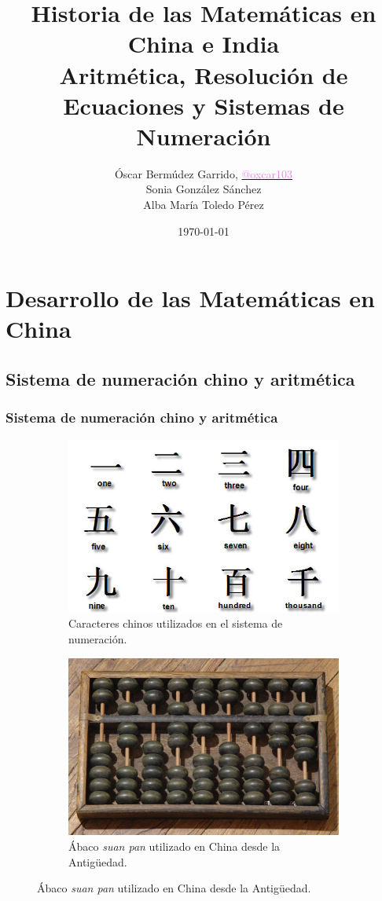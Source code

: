 \documentclass[12pt, aspectratio=169]{beamer} %
\title[Historia de las Matemáticas en China e India]{\Large Historia de las Matemáticas en China e India\\
\normalsize Aritmética, Resolución de Ecuaciones y Sistemas de Numeración} %
\author[Óscar Bermúdez, Sonia González, Alba Mª Toledo]{
	Óscar Bermúdez Garrido, \href{http://www.github.com/oxcar103}{\textcolor{violet}{@oxcar103}}\\
	Sonia González Sánchez \\
	Alba María Toledo Pérez
} %
\institute[UGR] %
{
  Universidad de Granada \\ %
}
\date{\today} %
\begin{document}
\begin{frame}
	\titlepage %
\end{frame}


 


\section{Desarrollo de las Matemáticas en China}
	\subsection{Sistema de numeración chino y aritmética}
		\begin{frame}
			\frametitle{Sistema de numeración chino y aritmética}
			\begin{figure}
			\centering
				\begin{subfigure}{.5\textwidth}
					\centering
					\includegraphics[width = .5\linewidth]{chinese_numbers.jpg}
					\caption{Caracteres chinos utilizados en el sistema de numeración.}
				\end{subfigure}%
				\begin{subfigure}{.5\textwidth}
					\centering
					\includegraphics[width = .5\linewidth]{Chinese-abacus.jpg}
					\caption{Ábaco \textit{suan pan} utilizado en China desde la Antigüedad.}
				\end{subfigure}
			\end{figure}
		\end{frame}
\end{document}

